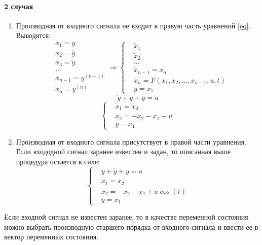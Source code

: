 \paragraph{2 случая}\mbox{}\par
\begin{enumerate}
	\item Производная от входного сигнала не входит в правую часть уравнений
		\ref{eq}.\\ Выводятся:
		\[ \begin{aligned}
			&x_1 = y \\ &x_2 = \dot y \\ &x_3 = \ddot y \\ &\dots \\ &x_{n-1} = 
			y^{(n-1)} \\ &x_n = y^{(n)}
		\end{aligned} \Longrightarrow
			\left\{ \begin{aligned}
					&\dot x_1 \\ &\dot x_2 \\ &\dots \\ &\dot x_{n-1} = x_n \\ & \dot x_n
					= F(x_1, x_2, \dots, x_{n-1}, u, t) \\ & y = x_1
		\end{aligned}\right. 
	\] 
	\null
	\[\ddot y + \dot y + y = u\]
	\[\left\{\begin{aligned}
		&\dot x_1 = x_2\\ &\dot x_2 = -x_2 - x_1 + u \\ &y = x_1
	\end {aligned}\right.\]

\item Производная от входного сигнала присутствует в правой части уравнения.
	Если входодной сигнал заранее известен и задан, то описанная выше процедура
	остается в силе:
	\[\left\{\begin{aligned}
			& \ddot y + \dot y + y = u \\ & \dot x_1 = x_2 \\ & \dot x_2 = -x_2 -x_1 +
			a \cos (t) \\ & y = x_1
	\end{aligned}\right. \]
\end{enumerate}\par
Если входной сигнал не известен заранее, то в качестве переменной состояния
можно выбрать производную старшего порядка от входного сигнала и ввести ее в
вектор переменных состояния.

